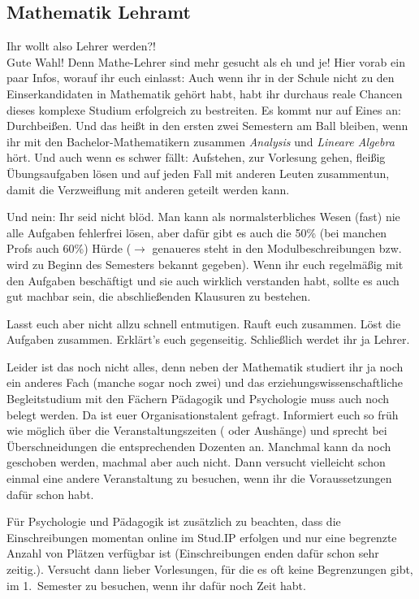 \subsection{Mathematik Lehramt}

Ihr wollt also Lehrer werden?!\\
Gute Wahl! Denn Mathe-Lehrer sind mehr gesucht als eh und je! 
Hier vorab ein paar Infos, worauf ihr euch einlasst: Auch wenn ihr in der Schule nicht zu den Einserkandidaten in Mathematik gehört habt, habt ihr durchaus reale Chancen dieses komplexe Studium erfolgreich zu bestreiten.
Es kommt nur auf Eines an: Durchbeißen.
Und das heißt in den ersten zwei Semestern am Ball bleiben, wenn ihr mit den Bachelor-Mathematikern zusammen \textit{Analysis} und \textit{Lineare Algebra} hört.
Und auch wenn es schwer fällt:
Aufstehen, zur Vorlesung gehen, fleißig Übungsaufgaben lösen und auf jeden Fall mit anderen Leuten zusammentun, damit die Verzweiflung mit anderen geteilt werden kann.

Und nein: Ihr seid nicht blöd.
Man kann als normalsterbliches Wesen (fast) nie alle Aufgaben fehlerfrei lösen, aber dafür gibt es auch die 50\% (bei manchen Profs auch 60\%) Hürde ($\rightarrow$  genaueres steht in den Modulbeschreibungen bzw. wird zu Beginn des Semesters bekannt gegeben).
Wenn ihr euch regelmäßig mit den Aufgaben beschäftigt und sie auch wirklich verstanden habt, sollte es auch gut machbar sein, die abschließenden Klausuren zu bestehen.

Lasst euch aber nicht allzu schnell entmutigen.
Rauft euch zusammen.
Löst die Aufgaben zusammen.
Erklärt’s euch gegenseitig.
Schließlich werdet ihr ja Lehrer.

Leider ist das noch nicht alles, denn neben der Mathematik studiert ihr ja noch ein anderes Fach (manche sogar noch zwei) und das erziehungswissenschaftliche Begleitstudium mit den Fächern Pädagogik und Psychologie muss auch noch belegt werden.
Da ist euer Organisationstalent gefragt.
Informiert euch so früh wie möglich über die Veranstaltungszeiten ( oder Aushänge) und sprecht bei Überschneidungen die entsprechenden Dozenten an.
Manchmal kann da noch geschoben werden, machmal aber auch nicht.
Dann versucht vielleicht schon einmal eine andere Veranstaltung zu besuchen, wenn ihr die Voraussetzungen dafür schon habt.

Für Psychologie und Pädagogik ist zusätzlich zu beachten, dass die Einschreibungen momentan online im Stud.IP erfolgen und nur eine begrenzte Anzahl von Plätzen verfügbar ist (Einschreibungen enden dafür schon sehr zeitig.).
Versucht dann lieber Vorlesungen, für die es oft keine Begrenzungen gibt, im 1.~Semester zu besuchen, wenn ihr dafür noch Zeit habt.

